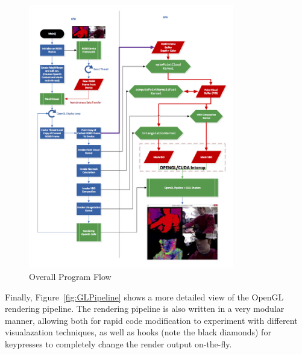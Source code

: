 \documentclass{jcgt}
\begin{document}
\begin{figure}[htb]
  \centering
   \includegraphics[width=0.8\textwidth]{../../diagrams/ProgramFlow.png}
   \caption{\label{fig:imgProcPipeline}
        Overall Program Flow}
\end{figure}

Finally, Figure~\ref{fig:GLPipeline} shows a more detailed view of the OpenGL rendering pipeline. The rendering pipeline is also written in a very modular manner, allowing both for rapid code modification to experiment with different visualazation techniques, as well as hooks (note the black diamonds) for keypresses to completely change the render output on-the-fly.
\end{document}
